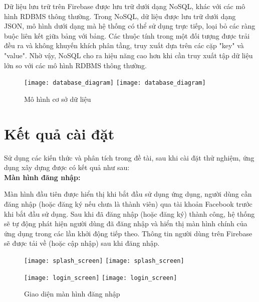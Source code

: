 Dữ liệu lưu trữ trên Firebase được lưu trữ dưới dạng NoSQL, khác với các mô hình RDBMS thông thường. Trong NoSQL, dữ liệu được lưu trữ dưới dạng JSON, mô hình dưới dạng mà hệ thống có thể sử dụng trực tiếp, loại bỏ các ràng buộc liên kết giữa bảng với bảng. Các thuộc tính trong một đối tượng được trải đều ra và không khuyến khích phân tầng, truy xuất dựa trên các cặp "key" và "value". Nhờ vậy, NoSQL cho ra hiệu năng cao hơn khi cần truy xuất tập dữ liệu lớn so với các mô hình RDBMS thông thường.


\begin{figure}[H]
  \begin{center}
    \ifpdf
      \texttt{[image: database\_diagram]}
    \else
      \texttt{[image: database\_diagram]}
    \fi
    \caption{Mô hình cơ sở dữ liệu}
    \label{DatabaseDiagram}
  \end{center}
\end{figure}

\pagebreak
\section{Kết quả cài đặt}

Sử dụng các kiến thức và phân tích trong đề tài, sau khi cài đặt thử nghiệm, ứng dụng xây dựng được có kết quả như sau:\\

\textbf{Màn hình đăng nhập:}
\vskip 0.1in

Màn hình đầu tiên được hiển thị khi bắt đầu sử dụng ứng dụng, người dùng cần đăng nhập (hoặc đăng ký nếu chưa là thành viên) qua tài khoản Facebook trước khi bắt đầu sử dụng. Sau khi đã đăng nhập (hoặc đăng ký) thành công, hệ thống sẽ tự động phát hiện người dùng đã đăng nhập và hiển thị màn hình chính của ứng dụng trong các lần khởi động tiếp theo. Thông tin người dùng trên Firebase sẽ được tải về (hoặc cập nhập) sau khi đăng nhập.\\

\begin{figure}[H]
  \begin{minipage}[b]{0.50\linewidth}
  	\centering
      \ifpdf
      \texttt{[image: splash\_screen]}
    \else
      \texttt{[image: splash\_screen]}
    \fi  	
  \end{minipage}
    \begin{minipage}[b]{0.50\linewidth}
  	\centering
      \ifpdf
      \texttt{[image: login\_screen]}
    \else
      \texttt{[image: login\_screen]}
    \fi  	
  \end{minipage}
    \caption{Giao diện màn hình đăng nhập}
    \label{LoginScreen}
\end{figure}

